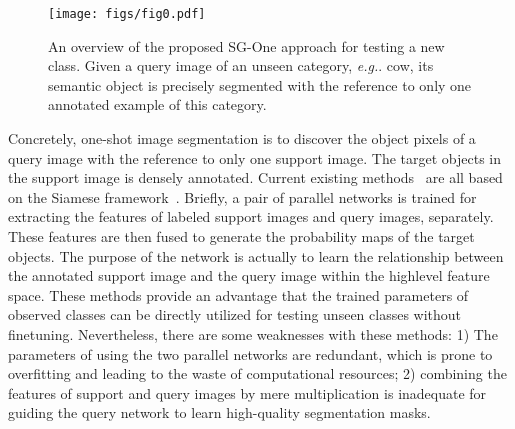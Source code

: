 \documentclass[journal]{IEEEtran}
\newcommand{\eg}{\emph{e.g.}}
\begin{document}
\begin{figure}[t]
  \centering
  \texttt{[image: figs/fig0.pdf]}
  \caption{An overview of the proposed SG-One approach for testing a new class.
  Given a query image of an unseen category, \eg. cow, its semantic object is precisely segmented with the reference to only one annotated example of this category.
  \vspace{-10pt}
  }\label{fig-0}
\end{figure}
Concretely, one-shot image segmentation is to discover the object pixels of a query image with the reference to only one support image.
The target objects in the support image is densely annotated.
Current existing methods~\cite{shaban2017one,rakelly2018conditional} are all based on the Siamese framework~\cite{koch2015siamese}.
Briefly, a pair of parallel networks is trained for extracting the features of labeled support images and query images, separately.
These features are then fused to generate the probability maps of the target objects.
The purpose of the network is actually to learn the relationship between the annotated support image and the query image within the highlevel feature space.
These methods provide an advantage that the trained parameters of observed classes can be directly utilized for testing unseen classes without finetuning.
Nevertheless, there are some weaknesses with these methods:
1) The parameters of using the two parallel networks are redundant, which is prone to overfitting and leading to the waste of computational resources;
2) combining the features of support and query images by mere multiplication is inadequate for guiding the query network to learn high-quality segmentation masks.
\end{document}
